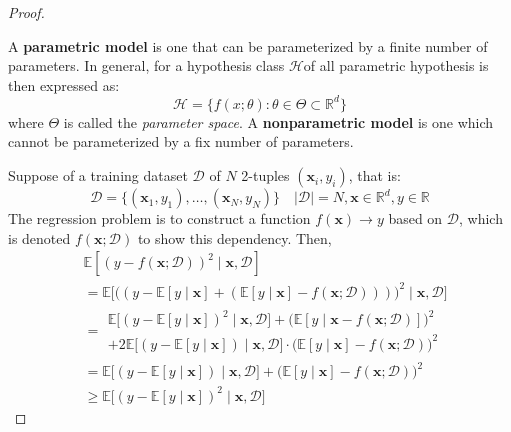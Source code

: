\documentclass[
  journal=largetwo,
  year=2025,
  volume=37,
]{cup-journal}
\begin{document}
\begin{proof}
    \begin{definition}[Parameterization]
        A \textbf{parametric model} is one that can be parameterized by a finite number of parameters. In general, for a hypothesis class $\mathcal{H}$of all parametric hypothesis is then expressed as:
        \begin{equation}
            \mathcal{H} = \{f(x;\theta): \theta \in \Theta \subset \mathbb{R}^{d}\}
        \end{equation} where $\Theta$ is called the \textit{parameter space}. A \textbf{nonparametric model} is one which cannot be parameterized by a fix number of parameters.   
    \end{definition}
    Suppose of a training dataset $\mathcal{D}$ of $N$ 2-tuples $(\mathbf{x}_{i},y_{i})$, that is: \begin{equation}
        \mathcal{D} = \{(\mathbf{x}_{1},y_{1}),\dots,(\mathbf{x}_{N},y_{N})\} \quad \lvert \mathcal{D} \rvert = N, \mathbf{x}\in \mathbb{R}^{d}, y \in \mathbb{R}
    \end{equation}
    The regression problem is to construct a function $f(\mathbf{x})\to y$ based on $\mathcal{D}$, which is denoted $f(\mathbf{x};\mathcal{D})$ to show this dependency. Then, 
    \begin{equation}
        \begin{split}
            &\mathbb{E}\left[ (y-f(\mathbf{x};\mathcal{D}))^{2}\mid \mathbf{x},\mathcal{D}\right]\\ & = \mathbb{E}\Big[\big( (y-\mathbb{E}[y\mid \mathbf{x}]+ (\mathbb{E}[y\mid \mathbf{x}]-f(\mathbf{x};\mathcal{D}))) \big)^{2}\mid \mathbf{x},\mathcal{D}\Big]\\
            & = \begin{multlined}
                \mathbb{E} \Big[ (y- \mathbb{E}[y\mid \mathbf{x}])^{2}\mid \mathbf{x},\mathcal{D} \Big] + \Big(\mathbb{E}[y\mid \mathbf{x}-f(\mathbf{x};\mathcal{D})]\Big)^{2} \\ + 2\mathbb{E} \big[(y-\mathbb{E}[y\mid \mathbf{x}])\mid \mathbf{x},\mathcal{D}\big]\cdot \big(\mathbb{E}[y\mid \mathbf{x}]-f(\mathbf{x;\mathcal{D}})\big)^{2} 
            \end{multlined} \\
            & = \mathbb{E} \Big[(y-\mathbb{E}[y\mid \mathbf{x}])\mid \mathbf{x},\mathcal{D}\Big] + \big(\mathbb{E}[y\mid \mathbf{x}]-f(\mathbf{x};\mathcal{D})\big)^{2}\\
            & \geq \mathbb{E} \big[(y-\mathbb{E}[y\mid \mathbf{x}])^{2}\mid \mathbf{x},\mathcal{D}\big]

\end{split}
\end{equation}
\end{proof}
\end{document}
